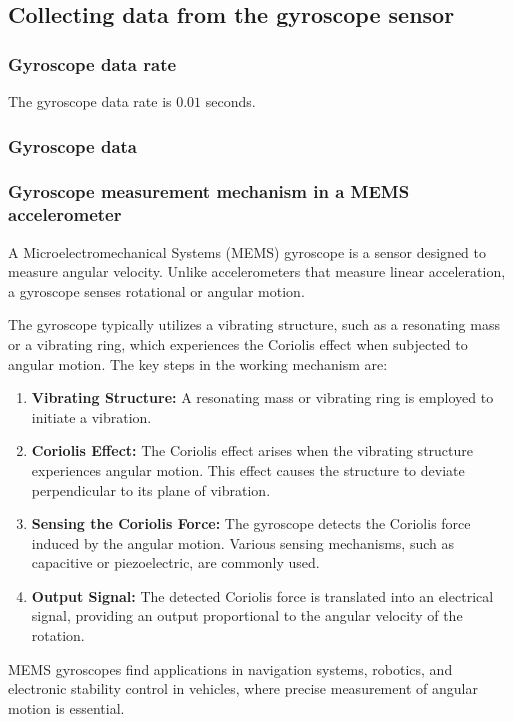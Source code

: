 \subsection{Collecting data from the gyroscope sensor}
\subsubsection{Gyroscope data rate}
The gyroscope data rate is $0.01$ seconds.
\subsubsection{Gyroscope data}

\subsubsection{Gyroscope measurement mechanism in a MEMS accelerometer}
A Microelectromechanical Systems (MEMS) gyroscope is a sensor designed to measure angular velocity. Unlike accelerometers that measure linear acceleration, a gyroscope senses rotational or angular motion.

The gyroscope typically utilizes a vibrating structure, such as a resonating mass or a vibrating ring, which experiences the Coriolis effect when subjected to angular motion. The key steps in the working mechanism are:

\begin{enumerate}
    \item \textbf{Vibrating Structure:} A resonating mass or vibrating ring is employed to initiate a vibration.
    
    \item \textbf{Coriolis Effect:} The Coriolis effect arises when the vibrating structure experiences angular motion. This effect causes the structure to deviate perpendicular to its plane of vibration.
    
    \item \textbf{Sensing the Coriolis Force:} The gyroscope detects the Coriolis force induced by the angular motion. Various sensing mechanisms, such as capacitive or piezoelectric, are commonly used.
    
    \item \textbf{Output Signal:} The detected Coriolis force is translated into an electrical signal, providing an output proportional to the angular velocity of the rotation.
\end{enumerate}

MEMS gyroscopes find applications in navigation systems, robotics, and electronic stability control in vehicles, where precise measurement of angular motion is essential.

